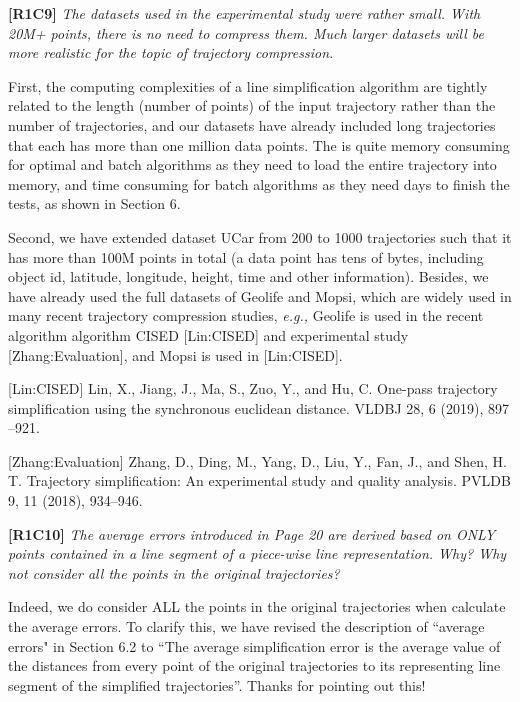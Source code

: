 \documentclass{letter}
\newcommand{\eg}{\emph{e.g.,}\xspace}
\begin{document}
\textbf{[R1C9]} \emph{ The datasets used in the experimental study were rather small. With 20M+ points, there is no need to compress them. Much larger datasets will be more realistic for the topic of trajectory compression.  }

First, the computing complexities of a line simplification algorithm are tightly related to the length (number of points) of the input trajectory rather than the number of trajectories, and our datasets have already included long trajectories that each has more than {one million} data points. The is quite memory consuming for optimal and batch algorithms  as they need to load the entire trajectory into memory, and time consuming for batch algorithms as they need {days} to finish the tests, as shown in Section 6.

Second, we have extended dataset UCar from 200 to 1000 trajectories such that it has more than {100M} points in total (a data point has tens of bytes, including object id, latitude, longitude, height, time and other information). Besides, we have already used the full datasets of Geolife and Mopsi, which are widely used in many recent trajectory compression studies, \eg Geolife is used in the recent algorithm algorithm CISED [Lin:CISED] and experimental study [Zhang:Evaluation], and Mopsi is used in [Lin:CISED].  %

[Lin:CISED] Lin, X., Jiang, J., Ma, S., Zuo, Y., and Hu, C. One-pass trajectory simplification using the synchronous euclidean distance. VLDBJ 28, 6 (2019), 897 --921.

[Zhang:Evaluation] Zhang, D., Ding, M., Yang, D., Liu, Y., Fan, J., and Shen, H. T. Trajectory simplification: An experimental study and quality analysis. PVLDB 9, 11 (2018), 934--946.

\textbf{[R1C10]} \emph{The average errors introduced in Page 20 are derived based on ONLY points contained in a line segment of a piece-wise line representation. Why? Why not consider all the points in the original trajectories? }

Indeed, we do consider ALL the points in the original trajectories when calculate the average errors. To clarify this, we have revised the description of ``average errors" in Section 6.2  to ``{The average simplification error is the average value of the distances from every point of the original trajectories to its representing line segment of the simplified trajectories}''. Thanks for pointing out this!
\end{document}
